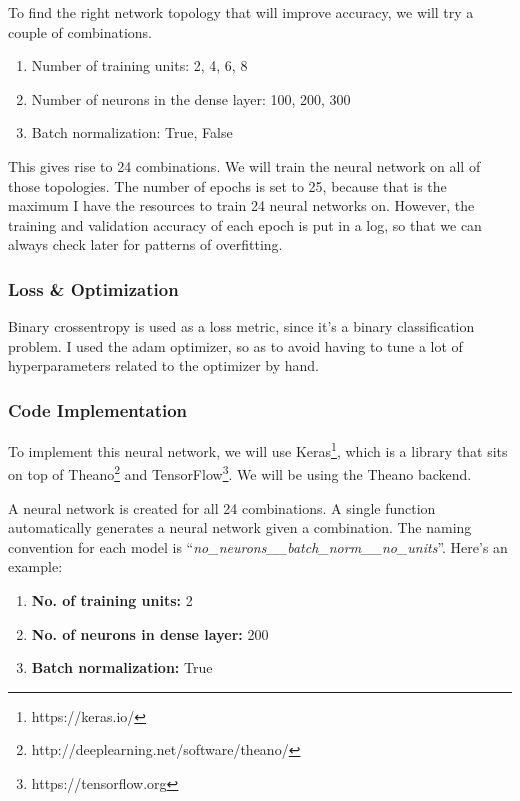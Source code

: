 \documentclass{article}
\begin{document}
To find the right network topology that will improve accuracy, we will try a couple of combinations.

\begin{enumerate}
\item{Number of training units: 2, 4, 6, 8}
\item{Number of neurons in the dense layer: 100, 200, 300}
\item{Batch normalization: True, False}
\end{enumerate}

This gives rise to 24 combinations. We will train the neural network on all of those topologies. The number of epochs is set to 25, because that is the maximum I have the resources to train 24 neural networks on. However, the training and validation accuracy of each epoch is put in a log, so that we can always check later for patterns of overfitting.

\subsubsection{Loss \& Optimization}

Binary crossentropy is used as a loss metric, since it's a binary classification problem. I used the adam optimizer, so as to avoid having to tune a lot of hyperparameters related to the optimizer by hand.

\subsubsection{Code Implementation}

To implement this neural network, we will use Keras\footnote{https://keras.io/}, which is a library that sits on top of Theano\footnote{http://deeplearning.net/software/theano/} and TensorFlow\footnote{https://tensorflow.org}. We will be using the Theano backend.

A neural network is created for all 24 combinations. A single function automatically generates a neural network given a combination. The naming convention for each model is ``\textit{no\_neurons\_\_batch\_norm\_\_no\_units}''. Here's an example:

\begin{enumerate}
\item{\textbf{No. of training units:} 2}
\item{\textbf{No. of neurons in dense layer:} 200}
\item{\textbf{Batch normalization:} True}
\end{enumerate}
\end{document}
